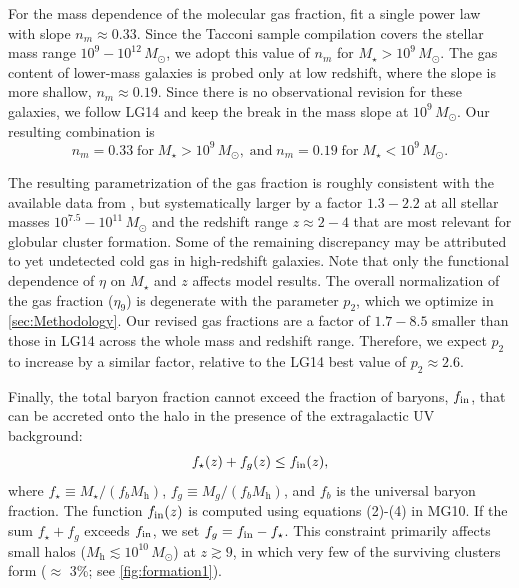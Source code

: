 \documentclass[fleqn,usenatbib]{mnras}
\newcommand{\Mh}{M_{\mathrm{h}}}
\newcommand{\Msun}{\,M_{\odot}}
\newcommand{\Mstar}{M_{\star}}
\newcommand{\fstar}{f_{\star}}
\begin{document}
For the mass dependence of the molecular gas fraction, \citet{tacconi_etal_2017} fit a single power law with slope $n_m \approx 0.33$. Since the Tacconi sample compilation covers the stellar mass range $10^{9} - 10^{12}\Msun$, we adopt this value of $n_m$ for $\Mstar > 10^{9}\Msun$. The gas content of lower-mass galaxies is probed only at low redshift, where the slope is more shallow, $n_m \approx 0.19$. Since there is no observational revision for these galaxies, we follow LG14 and keep the break in the mass slope at $10^{9}\Msun$. Our resulting combination is
\begin{equation}
  n_m = 0.33 \;\mathrm{for}\; \Mstar > 10^{9}\Msun, \;\mathrm{and}\; n_m = 0.19 \;\mathrm{for}\; \Mstar < 10^{9}\Msun.
  \nonumber
\end{equation}

The resulting parametrization of the gas fraction is roughly consistent with the available data from \citet{tacconi_etal_2017}, but systematically larger by a factor $1.3-2.2$ at all stellar masses $10^{7.5} - 10^{11}\Msun$ and the redshift range $z \approx 2-4$ that are most relevant for globular cluster formation. Some of the remaining discrepancy may be attributed to yet undetected cold gas in high-redshift galaxies. Note that only the functional dependence of $\eta$ on $\Mstar$ and $z$ affects model results.  The overall normalization of the gas fraction ($\eta_{9}$) is degenerate with the parameter $p_2$, which we optimize in \autoref{sec:Methodology}. Our revised gas fractions are a factor of $1.7-8.5$ smaller than those in LG14 across the whole mass and redshift range.  Therefore, we expect $p_2$ to increase by a similar factor, relative to the LG14 best value of $p_2 \approx 2.6$.

Finally, the total baryon fraction cannot exceed the fraction of baryons, $f_{\rm in}$, that can be accreted onto the halo in the presence of the extragalactic UV background: 
\begin{equation}
  \fstar(z) + f_g(z) \leq f_{\rm in}(z),
\end{equation}
where $\fstar \equiv \Mstar/(f_b\Mh)$, $f_g \equiv M_{g}/(f_b\Mh)$, and $f_b$ is the universal baryon fraction. The function $f_{\rm in}(z)$ is computed using equations (2)-(4) in MG10. If the sum $\fstar + f_g$ exceeds $f_{\rm in}$, we set $f_g = f_{\rm in} - \fstar$. This constraint primarily affects small halos ($\Mh \lesssim 10^{10}\Msun$) at $z \gtrsim 9$, in which very few of the surviving clusters form ($\approx$ 3\%; see \autoref{fig:formation1}).
\end{document}
